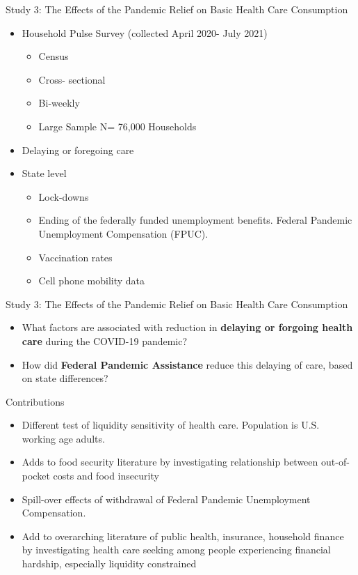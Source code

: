 \documentclass[t, hyperref={colorlinks=true}, compress]{beamer}
\begin{document}
\begin{frame}{Study 3: The Effects of the Pandemic Relief on Basic Health Care Consumption}
\centering
\begin{itemize}
\item Household Pulse Survey (collected April 2020- July 2021) 
\begin{itemize}
\item Census
\item Cross- sectional 
\item Bi-weekly
\item Large Sample N= 76,000 Households
\end{itemize}
\bigskip
\bigskip
\item Delaying or foregoing care
\bigskip
\bigskip
\item State level
\begin{itemize} 
\item Lock-downs 
\item Ending of the federally funded unemployment benefits. Federal Pandemic Unemployment Compensation (FPUC).
\item Vaccination rates
\item Cell phone mobility data 
\end{itemize}
\end{itemize}
\end{frame}

\begin{frame}{Study 3: The Effects of the Pandemic Relief on Basic Health Care Consumption} 
\begin{itemize} 
\bigskip
\bigskip
\item What factors are associated with reduction in \textbf{delaying or forgoing health care} during the COVID-19 pandemic? 
\bigskip
\bigskip
\bigskip
\item 	How did \textbf{Federal Pandemic Assistance} reduce this delaying of care, based on state differences?
\end{itemize}
\end{frame}



\begin{frame}{Contributions}
\begin{itemize}

\item Different test of liquidity sensitivity of health care. Population is U.S. working age adults.
\bigskip
\item Adds to food security literature by investigating relationship between out-of-pocket costs and food insecurity
\bigskip
\item Spill-over effects of withdrawal of Federal Pandemic Unemployment Compensation. 
\bigskip
\item Add to overarching literature of public health, insurance, household finance by investigating health care seeking among people experiencing financial hardship, especially liquidity constrained
\end{itemize}

\end{frame}
\end{document}
